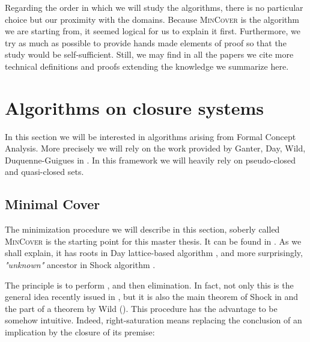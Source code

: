 \vspace{1.2em}

Regarding the order in which we will study the algorithms, there is no particular choice but our proximity with the domains. Because \textsc{MinCover} 
is the algorithm we are starting from, it seemed logical for us to explain
it first. Furthermore, we try as much as possible to provide hands made elements
of proof so that the study would be self-sufficient. Still, we may find in all
the papers we cite more technical definitions and proofs extending 
the knowledge we summarize here.





\section{Algorithms on closure systems}

In this section we will be interested in algorithms arising from Formal Concept
Analysis. More precisely we will rely on the work provided by Ganter, Day, Wild,
Duquenne-Guigues in \cite{ganter_formal_1999, ganter_two_2010, day_lattice_1992, wild_implicational_1989, wild_computations_1995, guigues_j.l_familles_1986, duquenne_variations_2007}. In this framework we will heavily rely on pseudo-closed and quasi-closed sets.



\subsection{Minimal Cover}

The minimization procedure we will describe in this section, soberly called
\textsc{MinCover} is the starting point for this master thesis. It can be found
in \cite{b._ganter_conceptual_2016}. As we shall explain, it has roots in
Day lattice-based algorithm \cite{day_lattice_1992}, and more surprisingly, 
\textit{"unknown"} ancestor in Shock algorithm \cite{shock_computing_1986}. 

\vspace{1.2em}

The principle is to perform , and then  elimination. In fact, not only this is the general idea recently 
issued in \cite{boros_strong_2017}, but it is also the main theorem of Shock in 
\cite{shock_computing_1986} and the part of a theorem by Wild 
(\cite{wild_implicational_1989, wild_theory_1994}). This procedure has the 
advantage to be somehow intuitive. Indeed, right-saturation means replacing the 
conclusion of an implication by the closure of its premise:

